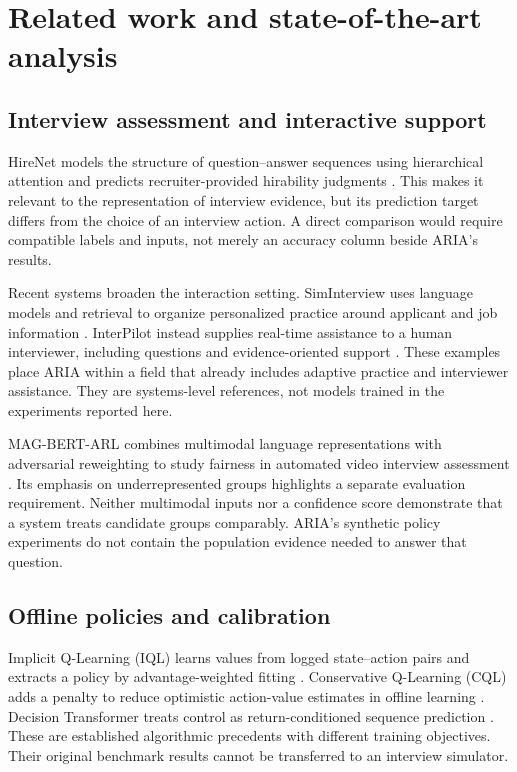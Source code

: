 \documentclass[10pt,a4paper]{article}
\begin{document}
\section{Related work and state-of-the-art analysis}
\subsection{Interview assessment and interactive support}
HireNet models the structure of question--answer sequences using hierarchical attention and predicts recruiter-provided hirability judgments \cite{hirenet}. This makes it relevant to the representation of interview evidence, but its prediction target differs from the choice of an interview action. A direct comparison would require compatible labels and inputs, not merely an accuracy column beside ARIA's results.

Recent systems broaden the interaction setting. SimInterview uses language models and retrieval to organize personalized practice around applicant and job information \cite{siminterview}. InterPilot instead supplies real-time assistance to a human interviewer, including questions and evidence-oriented support \cite{interpilot}. These examples place ARIA within a field that already includes adaptive practice and interviewer assistance. They are systems-level references, not models trained in the experiments reported here.

MAG-BERT-ARL combines multimodal language representations with adversarial reweighting to study fairness in automated video interview assessment \cite{mag}. Its emphasis on underrepresented groups highlights a separate evaluation requirement. Neither multimodal inputs nor a confidence score demonstrate that a system treats candidate groups comparably. ARIA's synthetic policy experiments do not contain the population evidence needed to answer that question.

\subsection{Offline policies and calibration}
Implicit Q-Learning (IQL) learns values from logged state--action pairs and extracts a policy by advantage-weighted fitting \cite{iql}. Conservative Q-Learning (CQL) adds a penalty to reduce optimistic action-value estimates in offline learning \cite{cql}. Decision Transformer treats control as return-conditioned sequence prediction \cite{dt}. These are established algorithmic precedents with different training objectives. Their original benchmark results cannot be transferred to an interview simulator.
\end{document}
